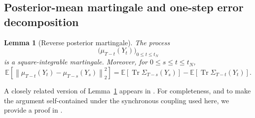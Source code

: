 \documentclass[11pt]{article}
\newtheorem{lemma}[theorem]{Lemma}
\theoremstyle{definition}
\newcommand{\E}{\mathbb{E}}
\newcommand{\norm}[1]{\left\lVert #1\right\rVert_2}
\newcommand{\Tr}{\operatorname{Tr}}
\begin{document}
\subsection{Posterior-mean martingale and one-step error decomposition}

\begin{lemma}[Reverse posterior martingale]
\label{lem:martingale}
The process
\[
    \bigl(\mu_{T-t}(Y_t)\bigr)_{0\le t\le t_N}
\]
is a square-integrable martingale. Moreover, for $0\le s\le t\le t_N$,
\begin{equation}
    \E\left[
        \norm{\mu_{T-t}(Y_t)-\mu_{T-s}(Y_s)}^2
    \right]
    =
    \E\left[\Tr\Sigma_{T-s}(Y_s)\right]
    -
    \E\left[\Tr\Sigma_{T-t}(Y_t)\right].
    \label{eq:martingale-isometry}
\end{equation}
\end{lemma}

A closely related version of Lemma~\ref{lem:martingale} appears in
\citet{huang2026optimal}. For completeness, and to make the argument
self-contained under the synchronous coupling used here, we provide
a proof in .
\end{document}
